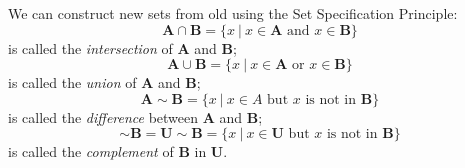 \documentclass{article}
\newcommand\A{\mathbf A}
\newcommand\B{\mathbf B}
\newcommand\U{\mathbf U}
\newcommand{\0}{\mathbf 0}
\newcommand{\1}{\mathbf 1}
\begin{document}
We can construct new sets from old using the Set Specification Principle:
\begin{equation*}
\A \cap \B = \{ x\ |\ x \in \A \text{ and } x \in \B \}
\end{equation*}
is called the \emph{intersection} of $\A$ and $\B$;
\begin{equation*}
\A \cup \B = \{ x\ |\ x \in \A \text{ or } x \in \B \}
\end{equation*}
is called the \emph{union} of $\A$ and $\B$;
\begin{equation*}
\A \sim \B = \{ x\ |\ x \in A \text{ but } x \text{ is not in } \B \}
\end{equation*}
is called the \emph{difference} between $\A$ and $\B$;
\begin{equation*}
\sim \B = \U \sim \B = \{ x\ |\ x \in \U \text{ but } x \text{ is not in } \B \}
\end{equation*}
is called the \emph{complement} of $\B$ in $\U$.
\end{document}
